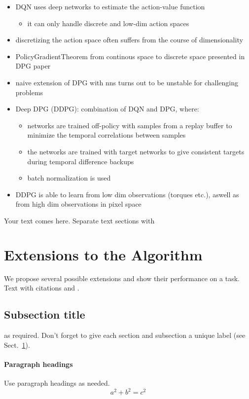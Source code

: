 \begin{itemize}
\item DQN uses deep networks to estimate the action-value function
\begin{itemize}
\item it can only handle discrete and low-dim action spaces
\end{itemize}
\item discretizing the action space often suffers from the course of dimensionality
\item PolicyGradientTheorem from continous space to discrete space presented in DPG paper
\item naive extension of DPG with nns turns out to be unstable for challenging problems
\item Deep DPG (DDPG): combination of DQN and DPG, where:
\begin{itemize}
\item networks are trained off-policy with samples from a replay buffer to minimize the temporal correlations between samples
\item the networks are trained with target networks to give consistent targets during temporal difference backups
\item batch normalization is used
\end{itemize}
\item DDPG is able to learn from low dim observations (torques etc.), aswell as from high dim observations in pixel space
\end{itemize}
Your text comes here. Separate text sections with


\section{Extensions to the Algorithm}
\label{sec:1}
We propose several possible extensions and show their performance on a task.\\
Text with citations \cite{RefB} and \cite{RefJ}.
\subsection{Subsection title}
\label{sec:2}
as required. Don't forget to give each section
and subsection a unique label (see Sect.~\ref{sec:1}).
\paragraph{Paragraph headings} Use paragraph headings as needed.
\begin{equation}
a^2+b^2=c^2
\end{equation}

